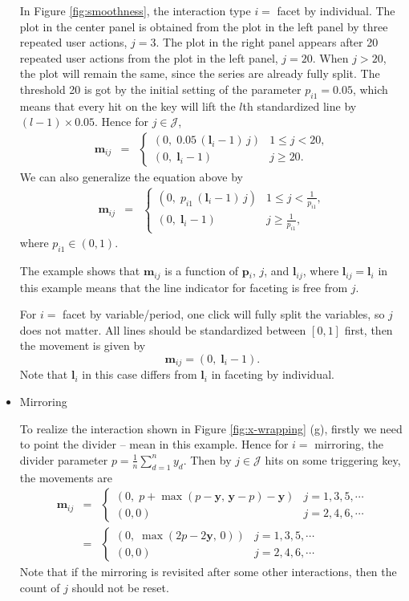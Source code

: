 \documentclass[12pt]{article}
\begin{document}
\begin{itemize}
In Figure \ref{fig:smoothness}, the interaction type
$i=$ facet by individual. The plot in the center
panel is obtained from the plot in the left panel by
three repeated user actions, $j=3$. The plot in the 
right panel appears after 20 repeated user actions from
the plot in the left panel, $j=20$. When $j>20$, the
plot will remain the same, since the series are already
fully split. The threshold 20 is got by the initial
setting of the parameter $p_{i1}=0.05$, which means that every hit
on the key will lift the $l$th standardized line by $(l-1)\times0.05$.
Hence for $j\in\mathcal{J}$,
\begin{eqnarray*}
\mathbf{m}{}_{ij} & = & \begin{cases}
 (0,\;0.05\, (\mathbf{l}{}_i-1)\, j) & 1\leq j<20,\\
 (0,\; \mathbf{l}{}_i-1) & j\ge20.
\end{cases}
\end{eqnarray*}
We can also generalize the equation above by
\begin{eqnarray*}
\mathbf{m}{}_{ij} & = & \begin{cases}
 (0,\; p_{i1}\, (\mathbf{l}{}_i-1)\, j) & 1\leq j<\frac{1}{p_{i1}},\\
 (0,\; \mathbf{l}{}_i-1) & j\ge\frac{1}{p_{i1}},
\end{cases}
\end{eqnarray*}
where $p_{i1}\in (0,1)$.

The example shows that $\mathbf{m}{}_{ij}$ is a function of $\mathbf{p}{}_{i}$,
$j$, and $\mathbf{l}_{ij}$, where $\mathbf{l}_{ij}=\mathbf{l}{}_i$ in this example
means that the line indicator for faceting is free from $j$.

For $i=$ facet by variable/period, one click will fully split
the variables, so $j$ does not matter. All lines should be 
standardized between $[0,1]$ first, then the movement is given by
\[
\mathbf{m}{}_{ij} = (0,\; \mathbf{l}{}_i-1).
\]
Note that $\mathbf{l}{}_i$ in this case differs from
$\mathbf{l}{}_i$ in faceting by individual.

\item Mirroring

To realize the interaction shown in Figure \ref{fig:x-wrapping} (g),
firstly we need to point the divider -- mean in this example.
Hence for $i=$ mirroring, the divider parameter
$p = \frac{1}{n}\sum_{d=1}^{n}y_d$. Then by $j\in\mathcal{J}$
hits on some triggering key, the movements are
\begin{eqnarray*}
\mathbf{m}{}_{ij} & = & \begin{cases}
(0, \; p+\max(p-\mathbf{y},\,\mathbf{y}-p)-\mathbf{y}) & j=1,3,5,\cdots \\
(0,0) & j=2,4,6,\cdots
\end{cases}\\ & = & \begin{cases}
(0, \; \max(2p-2\mathbf{y},\,0)) & j=1,3,5,\cdots \\
(0,0) & j=2,4,6,\cdots
\end{cases}
\end{eqnarray*}
Note that if the mirroring is revisited after some other interactions,
then the count of $j$ should not be reset.


\end{itemize}
\end{document}
